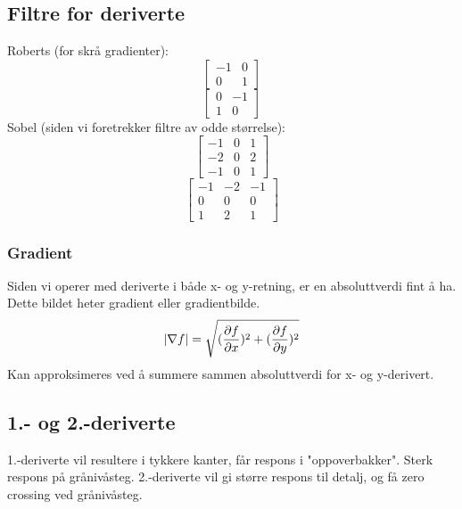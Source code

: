 \subsection{Filtre for deriverte}
Roberts (for skrå gradienter):
\begin{equation}
    \begin{bmatrix}
        -1 & 0 \\
        0 & 1
    \end{bmatrix}
\end{equation}
\begin{equation}
    \begin{bmatrix}
        0 & -1 \\
        1 & 0
    \end{bmatrix}
\end{equation}
Sobel (siden vi foretrekker filtre av odde størrelse):
\begin{equation}
    \begin{bmatrix}
        -1 & 0 & 1 \\
        -2 & 0 & 2 \\
        -1 & 0 & 1
    \end{bmatrix}
\end{equation}
\begin{equation}
    \begin{bmatrix}
        -1 & -2 & -1 \\
        0 & 0 & 0 \\
        1 & 2 & 1
    \end{bmatrix}
\end{equation}

\subsubsection{Gradient}
Siden vi operer med deriverte i både x- og y-retning, er en absoluttverdi fint å ha. Dette bildet heter gradient eller gradientbilde.
\begin{equation}
    |\nabla f| = \sqrt{
        ({\partial f \over \partial x})^2 + ({\partial f \over \partial y})^2
    }
\end{equation}
Kan approksimeres ved å summere sammen absoluttverdi for x- og y-derivert.

\subsection{1.- og 2.-deriverte}
1.-deriverte vil resultere i tykkere kanter, får respons i "oppoverbakker". Sterk respons på grånivåsteg. 2.-deriverte vil gi større respons til detalj, og få zero crossing ved grånivåsteg.
